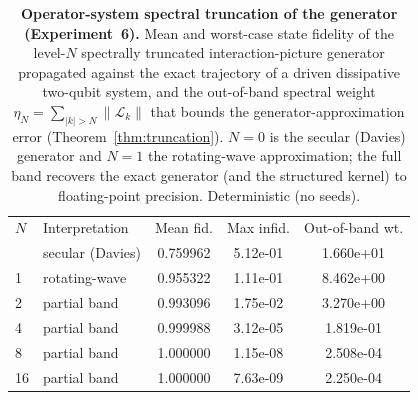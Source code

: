 \documentclass[twocolumn,aps,prxquantum,superscriptaddress,nofootinbib,floatfix,longbibliography]{revtex4-2}
\newcommand{\calL}{\mathcal{L}}
\newcommand{\norm}[1]{\left\lVert #1 \right\rVert}
\newcommand{\sync}[1]{#1}
\begin{document}
\begin{table}[t]
\centering
\caption{\textbf{Operator-system spectral truncation of the generator (Experiment~6).} Mean and worst-case state fidelity of the level-$N$ spectrally truncated interaction-picture generator propagated against the exact trajectory of a driven dissipative two-qubit system, and the out-of-band spectral weight $\eta_N=\sum_{|k|>N}\norm{\calL_k}$ that bounds the generator-approximation error (Theorem~\ref{thm:truncation}). $N{=}0$ is the secular (Davies) generator and $N{=}1$ the rotating-wave approximation; the full band recovers the exact generator (and the structured kernel) to floating-point precision. Deterministic (no seeds).}
\label{tab:exp6}
\begin{ruledtabular}
\begin{tabular}{llccc}
$N$ & Interpretation & Mean fid. & Max infid. & Out-of-band wt. \\
\colrule
0 & secular (Davies) & \sync{0.759962} & \sync{5.12e-01} & \sync{1.660e+01} \\
1 & rotating-wave & \sync{0.955322} & \sync{1.11e-01} & \sync{8.462e+00} \\
2 & partial band & \sync{0.993096} & \sync{1.75e-02} & \sync{3.270e+00} \\
4 & partial band & \sync{0.999988} & \sync{3.12e-05} & \sync{1.819e-01} \\
8 & partial band & \sync{1.000000} & \sync{1.15e-08} & \sync{2.508e-04} \\
16 & partial band & \sync{1.000000} & \sync{7.63e-09} & \sync{2.250e-04} \\
\end{tabular}
\end{ruledtabular}
\end{table}
\end{document}
